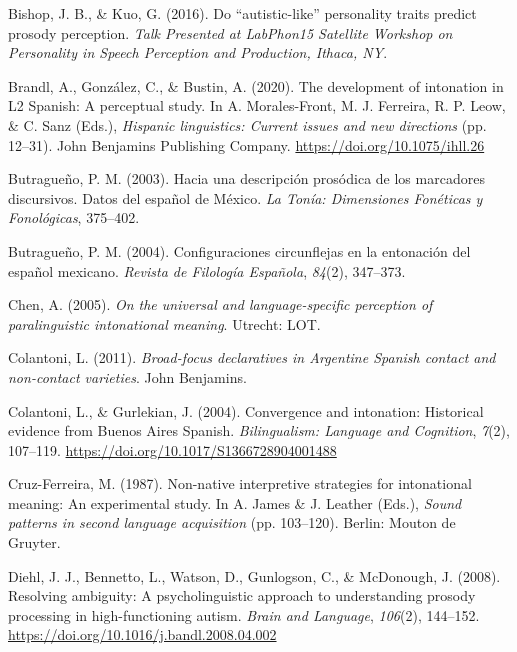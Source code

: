 \documentclass[]{article}
\newlength{\cslhangindent}
\newenvironment{CSLReferences}[2] %
 {%
  \setlength{\parindent}{0pt}
  \ifodd #1 \everypar{\setlength{\hangindent}{\cslhangindent}}\ignorespaces\fi
  \ifnum #2 > 0
  \setlength{\parskip}{#2\baselineskip}
  \fi
 }%
 {}
\begin{document}
\begin{CSLReferences}{1}{0}
\leavevmode{}%
Bishop, J. B., \& Kuo, G. (2016). Do {``autistic-like''} personality traits predict prosody perception. \emph{Talk Presented at LabPhon15 Satellite Workshop on Personality in Speech Perception and Production, Ithaca, NY}.

\leavevmode{}%
Brandl, A., González, C., \& Bustin, A. (2020). The development of intonation in {L}2 {S}panish: {A} perceptual study. In A. Morales-Front, M. J. Ferreira, R. P. Leow, \& C. Sanz (Eds.), \emph{Hispanic linguistics: Current issues and new directions} (pp. 12--31). John Benjamins Publishing Company. \url{https://doi.org/10.1075/ihll.26}

\leavevmode{}%
Butragueño, P. M. (2003). Hacia una descripción prosódica de los marcadores discursivos. {D}atos del español de {M}éxico. \emph{La Tonía: Dimensiones Fonéticas y Fonológicas}, 375--402.

\leavevmode{}%
Butragueño, P. M. (2004). Configuraciones circunflejas en la entonación del español mexicano. \emph{{R}evista de {F}ilología {E}spañola}, \emph{84}(2), 347--373.

\leavevmode{}%
Chen, A. (2005). \emph{On the universal and language-specific perception of paralinguistic intonational meaning}. Utrecht: LOT.

\leavevmode{}%
Colantoni, L. (2011). \emph{Broad-focus declaratives in {A}rgentine {S}panish contact and non-contact varieties}. John Benjamins.

\leavevmode{}%
Colantoni, L., \& Gurlekian, J. (2004). Convergence and intonation: Historical evidence from {Buenos Aires Spanish}. \emph{Bilingualism: Language and Cognition}, \emph{7}(2), 107--119. \url{https://doi.org/10.1017/S1366728904001488}

\leavevmode{}%
Cruz-Ferreira, M. (1987). Non-native interpretive strategies for intonational meaning: An experimental study. In A. James \& J. Leather (Eds.), \emph{Sound patterns in second language acquisition} (pp. 103--120). Berlin: Mouton de Gruyter.

\leavevmode{}%
Diehl, J. J., Bennetto, L., Watson, D., Gunlogson, C., \& McDonough, J. (2008). Resolving ambiguity: {A} psycholinguistic approach to understanding prosody processing in high-functioning autism. \emph{Brain and Language}, \emph{106}(2), 144--152. \url{https://doi.org/10.1016/j.bandl.2008.04.002}


\end{CSLReferences}
\end{document}
